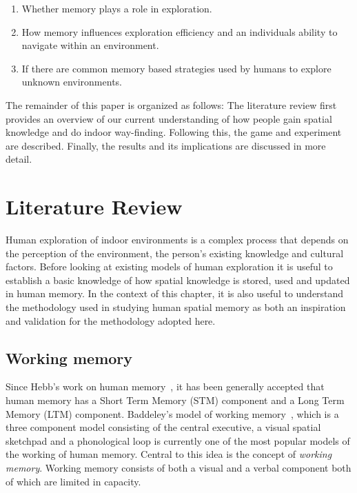 \begin{enumerate}
\item Whether memory plays a role in exploration.
\item How memory influences exploration efficiency and an individuals ability to navigate within an environment.
\item If there are common memory based strategies used by humans to explore unknown environments.
\end{enumerate}

The remainder of this paper is organized as follows: The literature review first provides an overview of our current understanding of how people gain spatial knowledge and do indoor way-finding. Following this, the game and experiment are described. Finally, the results and its implications are discussed in more detail.

\section{Literature Review} %
\label{sec:literature_review}


Human exploration of indoor environments is a complex process that depends on the perception of the environment, the person's existing knowledge and cultural factors. Before looking at existing models of human exploration it is useful to establish a basic knowledge of how spatial knowledge is stored, used and updated in human memory. In the context of this chapter, it is also useful to understand the methodology used in studying human spatial memory as both an inspiration and validation for the methodology adopted here.

\subsection{Working memory} %
\label{sec:spatial_information_in_human_working_memory}


Since Hebb's work on human memory~\cite{DOH1949}, it has been generally accepted that human memory has a Short Term Memory (STM) component and a Long Term Memory (LTM) component. Baddeley's model of working memory~\cite{BaddeleyHitch74}, which is a three component model consisting of the central executive, a visual spatial sketchpad and a phonological loop is currently one of the most popular models of the working of human memory. Central to this idea is the concept of \emph{working memory}. Working memory consists of both a visual and a verbal component both of which are limited in capacity.

